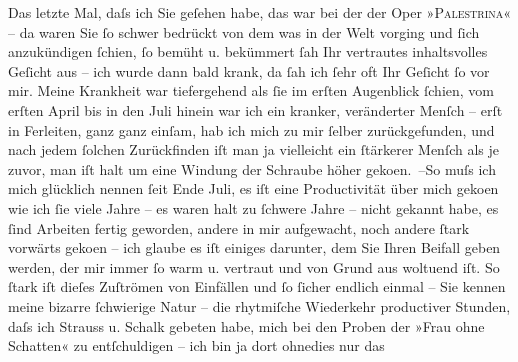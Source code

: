\begin{ledgroupsized}[t]{13cm}
           \pstart
           Das letzte Mal, daſs ich Sie geſehen habe, das war bei der \label{K_L02326_1v}\label{K_L02326_1h} der Oper »\textsc{Palestrina}« – da waren Sie ſo schwer bedrückt von dem was in der Welt vorging und ſich
               anzukündigen ſchien, ſo bemüht u. bekümmert ſah Ihr vertrautes inhaltsvolles Geſicht
               aus – ich wurde dann bald krank, da ſah ich ſehr oft Ihr Geſicht ſo vor mir. Meine
               Krankheit war tiefergehend als ſie im erſten Augenblick ſchien, vom erſten
                  April bis in den Juli hinein war ich ein kranker, veränderter
               Menſch – erſt in Ferleiten, ganz ganz einſam, hab
               ich mich zu mir ſelber {\pb}zurückgefunden, und nach jedem ſolchen Zurückfinden iſt man ja vielleicht ein
               ſtärkerer Menſch als je zuvor, man iſt halt um eine Windung der Schraube höher geko{\geminationm}en. –\hspace*{1.5em}So muſs ich mich
               glücklich nennen ſeit Ende Juli, es iſt eine Productivität über mich
                  geko{\geminationm}en wie ich ſie viele Jahre – es waren halt zu
               ſchwere Jahre – nicht gekannt habe, es ſind Arbeiten fertig geworden, andere in mir
               aufgewacht, noch andere ſtark vorwärts geko{\geminationm}en – ich
               glaube es iſt einiges darunter, dem Sie Ihren Beifall geben werden, der mir immer ſo
               warm u. vertraut und von Grund aus woltuend iſt.\pend
           \pstart
           So ſtark iſt dieſes Zuſtrömen von Einfällen und ſo ſicher endlich einmal – Sie kennen
               meine bizarre ſchwierige Natur – die rhytmiſche Wiederkehr productiver Stunden, daſs
               ich Strauss u. Schalk gebeten habe, mich bei den Proben der »Frau ohne Schatten« zu entſchuldigen – ich bin ja dort ohnedies nur das

\end{ledgroupsized}
